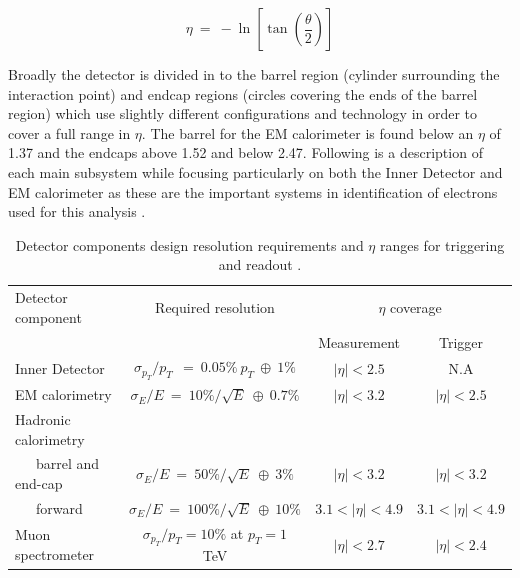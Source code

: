 
	\begin{equation}
		\eta~=~-\ln[\tan(\frac{\theta}{2})]
		\label{eq:eta}
	\end{equation}

	Broadly the detector is divided in to the barrel region (cylinder surrounding the interaction point) and endcap regions (circles covering the ends of the barrel region) which use slightly different configurations and technology in order to cover a full range in $\eta$. The barrel for the EM calorimeter is found below an $\eta$ of 1.37 and the endcaps above 1.52 and below 2.47. Following is a description of each main subsystem while focusing particularly on both the Inner Detector and EM calorimeter as these are the important systems in identification of electrons used for this analysis \cite{Aad:1129811}.


	\begin {table}[h]
	\begin{center}
	\begin{tabular}{ | l | c | c | c | } 
		\hline
		Detector component & Required resolution & \multicolumn{2}{c|}{$\eta$ coverage} \\
		\cline{3-4}
		 & & Measurement & Trigger \\
    	\hline\hline
    	Inner Detector & $\sigma_{p_{T}}/p_{T}~~=~0.05\%~p_{T}~\oplus~1\%$ & $|\eta|<2.5$ & N.A \\
    	\hline
    	EM calorimetry & $\sigma_{E}/E~=~10\%/\sqrt{E}~\oplus~0.7\%$ & $|\eta|<3.2$ & $|\eta|<2.5$ \\
    	\hline
    	Hadronic calorimetry &  &  &  \\
    	~~~barrel and end-cap & $\sigma_{E}/E~=~50\%/\sqrt{E}~\oplus~3\%$ & $|\eta|<3.2$ & $|\eta|<3.2$ \\
    	~~~forward  & $\sigma_{E}/E~=~100\%/\sqrt{E}~\oplus~10\%$ & $3.1<|\eta|<4.9$ & $3.1<|\eta|<4.9$ \\
    	\hline
    	Muon spectrometer & $\sigma_{p_{T}}/p_{T} =10\%$ at $p_{T} = 1$ TeV & $|\eta|<2.7$ & $|\eta|<2.4$ \\
    	\hline
  	\end{tabular}
  	\label{tab:det_res}
  	\caption{Detector components design resolution requirements and $\eta$ ranges for triggering and readout \cite{Aad:1129811}.}
  	\end{center}
	\end {table}




